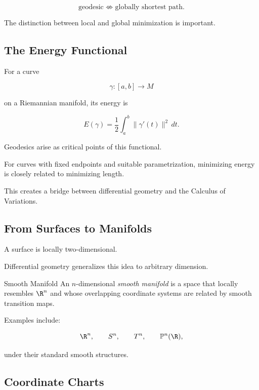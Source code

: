 \[
\boxed{
\text{geodesic}
\not\Longleftrightarrow
\text{globally shortest path}.
}
\]

The distinction between local and global minimization is important.

\subsection{The Energy Functional}
\label{subsec:geodesic-energy}

For a curve

\[
\gamma:[a,b]\to M
\]

on a Riemannian manifold, its energy is

\[
\boxed{
E(\gamma)
=
\frac12
\int_a^b
\|\gamma'(t)\|^2\,dt.
}
\]

Geodesics arise as critical points of this functional.

For curves with fixed endpoints and suitable parametrization, minimizing
energy is closely related to minimizing length.

This creates a bridge between differential geometry and the Calculus of
Variations.

\subsection{From Surfaces to Manifolds}
\label{subsec:surfaces-to-manifolds}

A surface is locally two-dimensional.

Differential geometry generalizes this idea to arbitrary dimension.

\begin{definitionbox}{Smooth Manifold}
An \(n\)-dimensional \emph{smooth manifold} is a space that locally resembles
\(\R^n\) and whose overlapping coordinate systems are related by smooth
transition maps.
\end{definitionbox}

Examples include:

\[
\R^n,
\qquad
S^n,
\qquad
T^n,
\qquad
\mathbb{P}^n(\R),
\]

under their standard smooth structures.

\subsection{Coordinate Charts}
\label{subsec:differential-coordinate-charts}

